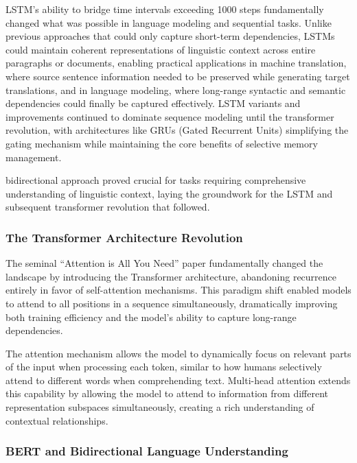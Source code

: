 \documentclass[
  titlepage]{article}
\begin{document}
LSTM's ability to bridge time intervals exceeding 1000 steps
fundamentally changed what was possible in language modeling and
sequential tasks. Unlike previous approaches that could only capture
short-term dependencies, LSTMs could maintain coherent representations
of linguistic context across entire paragraphs or documents, enabling
practical applications in machine translation, where source sentence
information needed to be preserved while generating target translations,
and in language modeling, where long-range syntactic and semantic
dependencies could finally be captured effectively. LSTM variants and
improvements continued to dominate sequence modeling until the
transformer revolution, with architectures like GRUs (Gated Recurrent
Units) simplifying the gating mechanism while maintaining the core
benefits of selective memory management.

bidirectional approach proved crucial for tasks requiring comprehensive
understanding of linguistic context, laying the groundwork for the LSTM
and subsequent transformer revolution that followed.

\subsubsection{The Transformer Architecture
Revolution}\label{the-transformer-architecture-revolution}

The seminal ``Attention is All You Need'' paper fundamentally changed
the landscape by introducing the Transformer architecture, abandoning
recurrence entirely in favor of self-attention mechanisms. This paradigm
shift enabled models to attend to all positions in a sequence
simultaneously, dramatically improving both training efficiency and the
model's ability to capture long-range dependencies.

The attention mechanism allows the model to dynamically focus on
relevant parts of the input when processing each token, similar to how
humans selectively attend to different words when comprehending text.
Multi-head attention extends this capability by allowing the model to
attend to information from different representation subspaces
simultaneously, creating a rich understanding of contextual
relationships.

\subsubsection{BERT and Bidirectional Language
Understanding}\label{bert-and-bidirectional-language-understanding}
\end{document}
